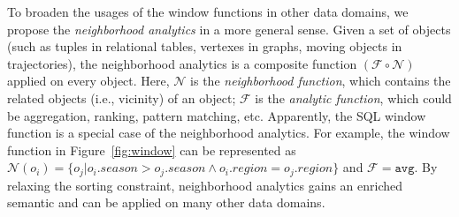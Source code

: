 To broaden the usages of the window functions in other data domains, we propose the \emph{neighborhood
analytics} in a more general sense. Given a set of objects 
(such as tuples in relational tables, vertexes in graphs, moving objects in trajectories),
the neighborhood analytics is a composite function
$(\mathcal{F} \circ \mathcal{N})$ applied on every object. Here, $\mathcal{N}$
is the \emph{neighborhood function}, which contains the related objects (i.e., vicinity) of an object;
$\mathcal{F}$ is the \emph{analytic function}, which could be aggregation, ranking,
pattern matching, etc.
Apparently, the SQL window function is a special case of the
neighborhood analytics. For example, the window function in Figure~\ref{fig:window} 
can be represented as $\mathcal{N}(o_i)=\{o_j | o_i.season > o_j.season \wedge o_i.region = o_j.region\}$
and $\mathcal{F} = \mathtt{avg}$.
By relaxing the sorting constraint, neighborhood analytics gains an enriched 
semantic and can be applied on many other data domains.

